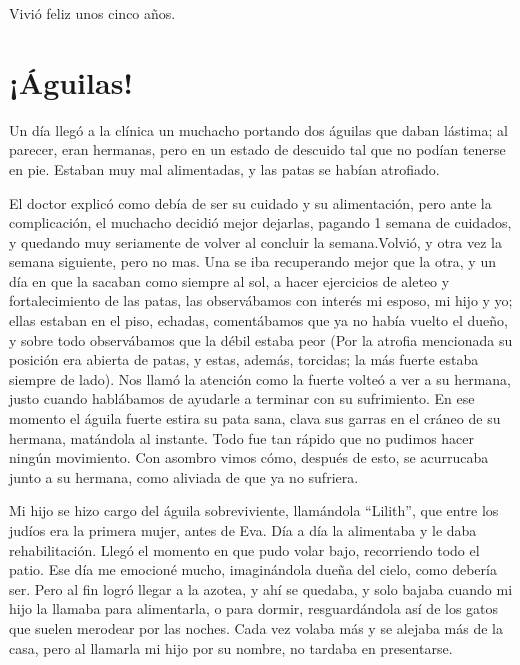 \documentclass[letterpaper, 12pt]{book}
\begin{document}
Vivió feliz unos cinco años.


\chapter{¡Águilas!}
Un día llegó a la clínica un muchacho portando dos águilas que daban lástima; al parecer, eran hermanas, pero en un estado de descuido tal que no podían tenerse en pie. Estaban muy mal alimentadas, y las patas se habían atrofiado.

El doctor explicó como debía de ser su cuidado y su alimentación, pero ante la complicación, el muchacho decidió mejor dejarlas, pagando 1 semana de cuidados, y quedando muy seriamente de volver al concluir la semana.Volvió, y otra vez la semana siguiente, pero no mas. Una se iba recuperando mejor que la otra, y un día en que la sacaban como siempre al sol, a hacer ejercicios de aleteo y fortalecimiento de las patas, las observábamos con interés mi esposo, mi hijo y yo; ellas estaban en el piso, echadas, comentábamos que ya no había vuelto el dueño, y sobre todo observábamos que la débil estaba peor (Por la atrofia mencionada su posición era abierta de patas, y estas, además, torcidas; la más fuerte estaba siempre de lado). Nos llamó la  atención como la fuerte volteó a ver a su hermana, justo cuando hablábamos de ayudarle a terminar con su sufrimiento. En ese momento el águila fuerte estira su pata sana, clava sus garras en el cráneo de su hermana, matándola al instante. Todo fue tan rápido que no pudimos hacer ningún movimiento. Con asombro vimos cómo, después de esto, se acurrucaba junto a su hermana, como aliviada de que ya no sufriera.

Mi hijo se hizo cargo del águila sobreviviente, llamándola ``Lilith'', que entre los judíos era la primera mujer, antes de Eva. Día a día la alimentaba y le daba rehabilitación. Llegó el momento en que pudo volar bajo, recorriendo todo el patio. Ese día me emocioné mucho, imaginándola dueña del cielo, como debería ser. Pero al fin logró llegar a la azotea, y ahí se quedaba, y solo bajaba cuando mi hijo la llamaba para alimentarla, o para dormir, resguardándola así de los gatos que suelen merodear por las noches. Cada vez volaba más y se alejaba más de la casa, pero al llamarla mi hijo por su nombre, no tardaba en presentarse.
\end{document}
